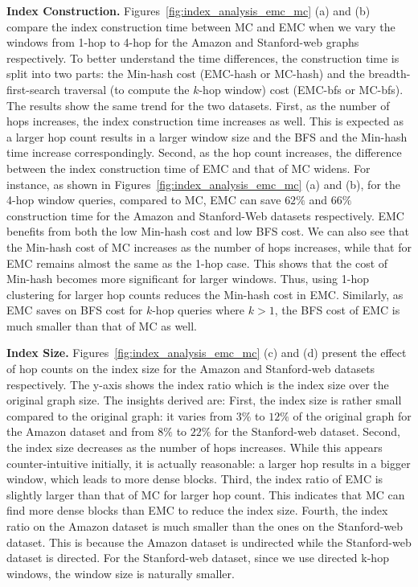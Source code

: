\textbf{Index Construction. } Figures~\ref{fig:index_analysis_emc_mc} 
(a) and (b) compare the index construction time between MC and EMC 
when we vary the windows from 1-hop to 4-hop for the Amazon and Stanford-web 
graphs respectively. To better understand the time differences, 
the construction time is split into two parts: 
the Min-hash cost (EMC-hash or MC-hash) and the breadth-first-search traversal (to compute the $k$-hop window)  cost (EMC-bfs or MC-bfs). The results show the same trend 
for the two datasets. %
First, as the number of hops increases, the index construction time increases as well. 
This is expected as a larger hop count results in a larger window size 
and the BFS and the Min-hash time increase correspondingly. 
Second, as the hop count increases, the difference between the
index construction time of EMC and that of MC widens. 
For instance, as shown in Figures~\ref{fig:index_analysis_emc_mc} (a) and (b), for the 4-hop window queries, compared to MC, 
EMC can save $62\%$ and $66\%$ construction time for the Amazon and Stanford-Web datasets respectively.
EMC benefits from both the low Min-hash cost and low BFS cost. 
We can also see that the Min-hash cost of MC increases as the number of hops 
increases, while that for EMC remains almost the same as the 1-hop case. 
This shows that the cost of Min-hash becomes more significant for larger windows. 
Thus, using 1-hop clustering for larger hop counts reduces the Min-hash cost 
in EMC. Similarly, as EMC saves on BFS cost for $k$-hop queries where $k > 1$, 
the BFS cost of EMC is much smaller than that of MC as well. 

\textbf{Index Size.} Figures~\ref{fig:index_analysis_emc_mc} (c) and (d) 
present the effect of hop counts on the index size for the Amazon and Stanford-web 
datasets respectively. The y-axis shows the index ratio which is the index size over the original graph size. 
The insights derived are: 
First, the index size is rather small compared to the original graph: it
varies from $3\%$ to $12\%$ of the original graph for the Amazon dataset 
and from $8\%$ to $22\%$ for the Stanford-web dataset. 
Second, the index size decreases as the number of hops increases. 
While this appears counter-intuitive initially, it is actually reasonable: a larger hop results in a bigger window, which leads
to more dense blocks. Third, the index ratio of EMC is slightly larger 
than that of MC for larger hop count. This indicates that MC can find more dense blocks 
than EMC to reduce the index size. Fourth, the index ratio on 
the Amazon dataset is much smaller than the ones on the Stanford-web dataset. 
This is because the Amazon dataset is undirected while the Stanford-web dataset
is directed. For the Stanford-web dataset, since we use directed k-hop windows, the window size is naturally smaller. 

